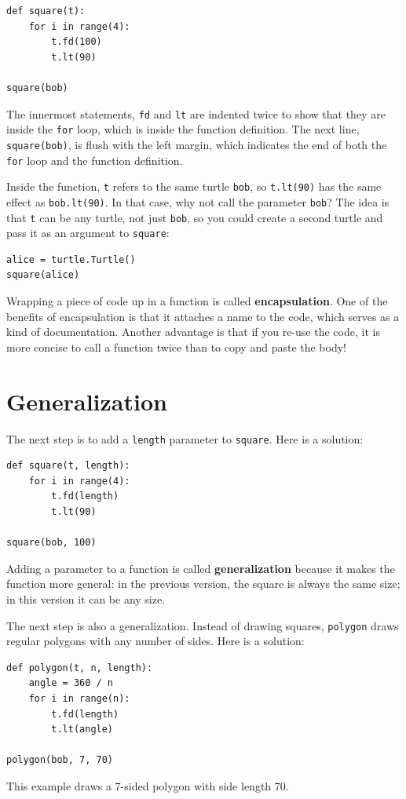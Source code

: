 \documentclass[10pt]{book}
\begin{document}
\begin{verbatim}
def square(t):
    for i in range(4):
        t.fd(100)
        t.lt(90)

square(bob)
\end{verbatim}
%
The innermost statements, {\tt fd} and {\tt lt} are indented twice to
show that they are inside the {\tt for} loop, which is inside the
function definition.  The next line, {\tt square(bob)}, is flush with
the left margin, which indicates the end of both the {\tt for} loop
and the function definition.

Inside the function, {\tt t} refers to the same turtle {\tt bob}, so
{\tt t.lt(90)} has the same effect as {\tt bob.lt(90)}.  In that
case, why not
call the parameter {\tt bob}?  The idea is that {\tt t} can be any
turtle, not just {\tt bob}, so you could create a second turtle and
pass it as an argument to {\tt square}:

\begin{verbatim}
alice = turtle.Turtle()
square(alice)
\end{verbatim}
%
Wrapping a piece of code up in a function is called {\bf
encapsulation}.  One of the benefits of encapsulation is that it
attaches a name to the code, which serves as a kind of documentation.
Another advantage is that if you re-use the code, it is more concise
to call a function twice than to copy and paste the body!


\section{Generalization}

The next step is to add a {\tt length} parameter to {\tt square}.
Here is a solution:

\begin{verbatim}
def square(t, length):
    for i in range(4):
        t.fd(length)
        t.lt(90)

square(bob, 100)
\end{verbatim}
%
Adding a parameter to a function is called {\bf generalization}
because it makes the function more general: in the previous
version, the square is always the same size; in this version
it can be any size.

The next step is also a generalization.  Instead of drawing
squares, {\tt polygon} draws regular polygons with any number of
sides.  Here is a solution:

\begin{verbatim}
def polygon(t, n, length):
    angle = 360 / n
    for i in range(n):
        t.fd(length)
        t.lt(angle)

polygon(bob, 7, 70)
\end{verbatim}
%
This example draws a 7-sided polygon with side length 70.
\end{document}
